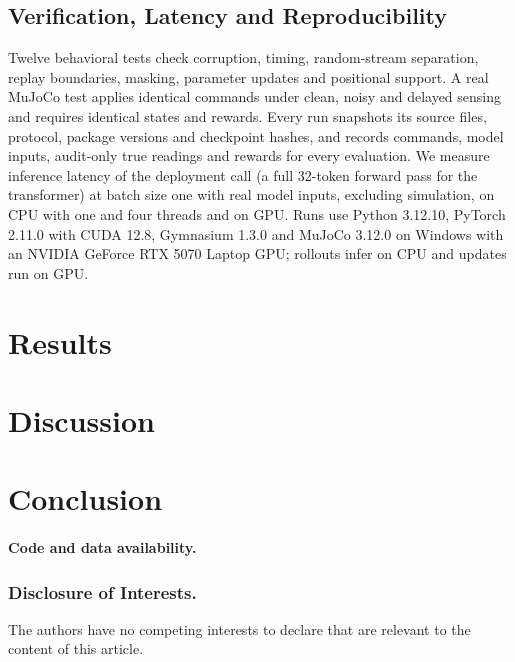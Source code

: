 \documentclass[runningheads]{llncs}
\begin{document}
\subsection{Verification, Latency and Reproducibility}
Twelve behavioral tests check corruption, timing, random-stream separation, replay boundaries, masking, parameter updates and positional support. A real MuJoCo test applies identical commands under clean, noisy and delayed sensing and requires identical states and rewards. Every run snapshots its source files, protocol, package versions and checkpoint hashes, and records commands, model inputs, audit-only true readings and rewards for every evaluation. We measure inference latency of the deployment call (a full 32-token forward pass for the transformer) at batch size one with real model inputs, excluding simulation, on CPU with one and four threads and on GPU. Runs use Python 3.12.10, PyTorch 2.11.0 with CUDA 12.8, Gymnasium 1.3.0 and MuJoCo 3.12.0 on Windows with an NVIDIA GeForce RTX 5070 Laptop GPU; rollouts infer on CPU and updates run on GPU.

\section{Results}


\section{Discussion}


\section{Conclusion}


\enlargethispage{1.5\baselineskip}\paragraph{Code and data availability.} 

{\small\subsubsection*{Disclosure of Interests.} The authors have no competing interests to declare that are relevant to the content of this article.\par}
\end{document}
